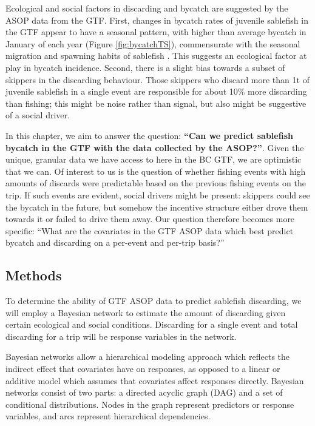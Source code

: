 \documentclass{article}
\begin{document}
Ecological and social factors in discarding and bycatch are suggested by the ASOP data from the GTF. First, changes in bycatch rates of juvenile sablefish in the GTF appear to have a seasonal pattern, with higher than average bycatch in January of each year (Figure \ref{fig:bycatchTS}), commensurate with the seasonal migration and spawning habits of sablefish \citep{beamish1988resident}. This suggests an ecological factor at play in bycatch incidence. Second, there is a slight bias towards a subset of skippers in the discarding behaviour. Those skippers who discard more than 1t of juvenile sablefish in a single event are responsible for about 10\% more discarding than fishing; this might be noise rather than signal, but also might be suggestive of a social driver.

In this chapter, we aim to answer the question: \textbf{``Can we predict sablefish bycatch in the GTF with the data collected by the ASOP?''}. Given the unique, granular data we have access to here in the BC GTF, we are optimistic that we can. Of interest to us is the question of whether fishing events with high amounts of discards were predictable based on the previous fishing events on the trip. If such events are evident, social drivers might be present: skippers could see the bycatch in the future, but somehow the incentive structure either drove them towards it or failed to drive them away. Our question therefore becomes more specific: ``What are the covariates in the GTF ASOP data which best predict bycatch and discarding on a per-event and per-trip basis?''

\subsection{Methods}

To determine the ability of GTF ASOP data to predict sablefish discarding, we will employ a Bayesian network \citep{nagarajan2013bayesian} to estimate the amount of discarding given certain ecological and social conditions. Discarding for a single event and total discarding for a trip will be response variables in the network. 

Bayesian networks allow a hierarchical modeling approach which reflects the indirect effect that covariates have on responses, as opposed to a linear or additive model which assumes that covariates affect responses directly. Bayesian networks consist of two parts: a directed acyclic graph (DAG) and a set of conditional distributions. Nodes in the graph represent predictors or response variables, and arcs represent hierarchical dependencies.
\end{document}
